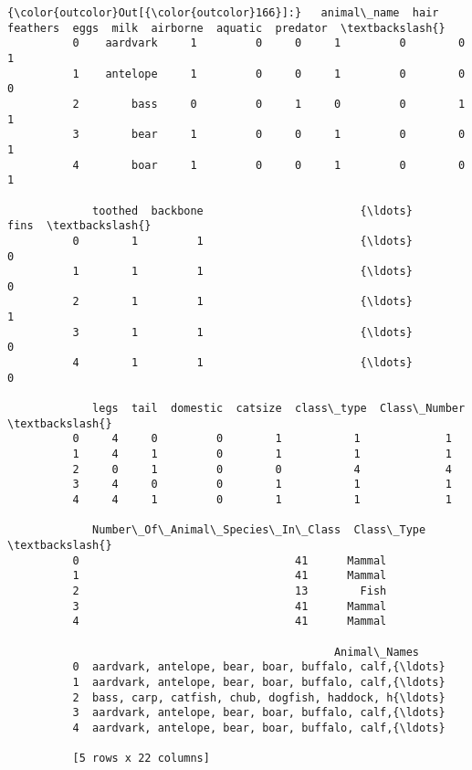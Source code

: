 \documentclass[11pt]{article}
\begin{document}
\begin{Verbatim}[commandchars=\\\{\}]
{\color{outcolor}Out[{\color{outcolor}166}]:}   animal\_name  hair  feathers  eggs  milk  airborne  aquatic  predator  \textbackslash{}
          0    aardvark     1         0     0     1         0        0         1   
          1    antelope     1         0     0     1         0        0         0   
          2        bass     0         0     1     0         0        1         1   
          3        bear     1         0     0     1         0        0         1   
          4        boar     1         0     0     1         0        0         1   
          
             toothed  backbone                        {\ldots}                          fins  \textbackslash{}
          0        1         1                        {\ldots}                             0   
          1        1         1                        {\ldots}                             0   
          2        1         1                        {\ldots}                             1   
          3        1         1                        {\ldots}                             0   
          4        1         1                        {\ldots}                             0   
          
             legs  tail  domestic  catsize  class\_type  Class\_Number  \textbackslash{}
          0     4     0         0        1           1             1   
          1     4     1         0        1           1             1   
          2     0     1         0        0           4             4   
          3     4     0         0        1           1             1   
          4     4     1         0        1           1             1   
          
             Number\_Of\_Animal\_Species\_In\_Class  Class\_Type  \textbackslash{}
          0                                 41      Mammal   
          1                                 41      Mammal   
          2                                 13        Fish   
          3                                 41      Mammal   
          4                                 41      Mammal   
          
                                                  Animal\_Names  
          0  aardvark, antelope, bear, boar, buffalo, calf,{\ldots}  
          1  aardvark, antelope, bear, boar, buffalo, calf,{\ldots}  
          2  bass, carp, catfish, chub, dogfish, haddock, h{\ldots}  
          3  aardvark, antelope, bear, boar, buffalo, calf,{\ldots}  
          4  aardvark, antelope, bear, boar, buffalo, calf,{\ldots}  
          
          [5 rows x 22 columns]
\end{Verbatim}
            
\end{document}
